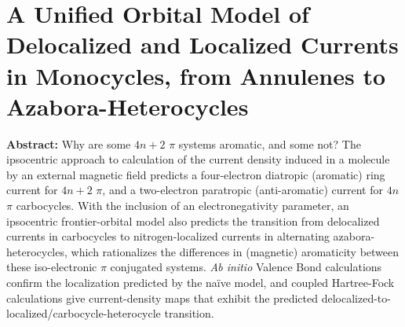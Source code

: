 \chapter{A Unified Orbital Model of Delocalized and Localized Currents in Monocycles, from Annulenes to Azabora-Heterocycles}
\label{chap_huckel}


\noindent\textbf{Abstract:} Why are some $4n+2$ $\pi$ systems aromatic, and some not?  The ipsocentric approach to calculation of the current density induced in a molecule by an external magnetic field predicts a four-electron diatropic (aromatic) ring current for $4n+2$ $\pi$, and a two-electron paratropic (anti-aromatic) current for $4n$ $\pi$ carbocycles. With the inclusion of an electronegativity parameter, an ipsocentric frontier-orbital model also predicts the transition from delocalized currents in carbocycles to nitrogen-localized currents in alternating azabora-heterocycles, which rationalizes the differences in (magnetic) aromaticity between these iso-electronic $\pi$ conjugated systems.  \textit{Ab initio} Valence Bond calculations confirm the localization predicted by the na\"ive model, and coupled Hartree-Fock calculations give current-density maps that exhibit the predicted delocalized-to-localized/carbocycle-heterocycle transition.
\clearpage


